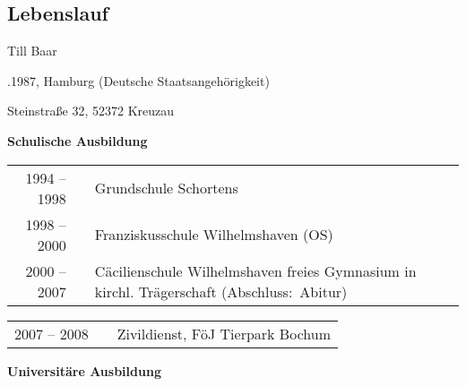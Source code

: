 \begin{otherlanguage}{german}

\chapter*{Lebenslauf}

{\LARGE Till Baar}

\vspace{\baselineskip}

.1987, Hamburg \hfill (Deutsche Staatsangehörigkeit)

\vspace{0.5\baselineskip}

\noindent Steinstraße 32, 52372 Kreuzau

\vspace{0.5\baselineskip}

\noindent\textbf{Schulische Ausbildung}\dotfill

\vspace{0.5\baselineskip}

\renewcommand{\arraystretch}{1.25}
\noindent\begin{tabularx}{\textwidth}{rcX}
1994 -- 1998 & & Grundschule Schortens \\
1998 -- 2000 & & Franziskusschule Wilhelmshaven (OS) \\
2000 -- 2007 & & Cäcilienschule Wilhelmshaven \newline freies Gymnasium in
                 kirchl. Trägerschaft \newline
                 \hspace*{\fill} (Abschluss:~Abitur) \\
\end{tabularx}

\vspace{\dp\strutbox}
\noindent\dotfill
\vspace{\dp\strutbox}

\noindent\begin{tabularx}{\textwidth}{rcX}
2007 -- 2008 & & Zivildienst, FöJ Tierpark Bochum \\
\end{tabularx}

\vspace{\dp\strutbox}
\noindent\textbf{Universitäre Ausbildung}\dotfill
\vspace{\dp\strutbox}


\end{otherlanguage}
